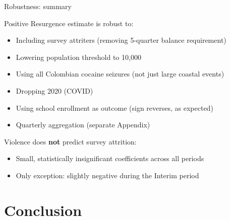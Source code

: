 \documentclass[aspectratio=169]{beamer}
\begin{document}
\begin{frame}{Robustness: summary}

Positive Resurgence estimate is robust to:

\begin{itemize}
    \item Including survey attriters (removing 5-quarter balance requirement)
    \item Lowering population threshold to 10,000
    \item Using all Colombian cocaine seizures (not just large coastal events)
    \item Dropping 2020 (COVID)
    \item Using school enrollment as outcome (sign reverses, as expected)
    \item Quarterly aggregation (separate Appendix)
\end{itemize}

\vspace{0.4cm}
\pause

Violence does \textbf{not} predict survey attrition:
\begin{itemize}
    \item Small, statistically insignificant coefficients across all periods
    \item Only exception: slightly negative during the Interim period
\end{itemize}

\end{frame}


\section{Conclusion}
\end{document}
